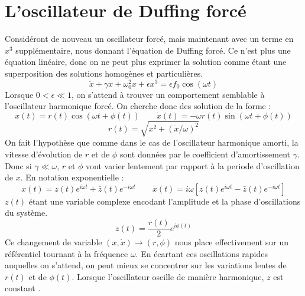 \chapter{L'oscillateur de Duffing forcé}
%
Considéront de nouveau un oscillateur forcé, mais maintenant avec un terme en $x^3$ supplémentaire, nous donnant l'équation de Duffing forcé. Ce n'est plus une équation linéaire, donc on ne peut plus exprimer la solution comme étant une superposition des solutions homogènes et particulières.
%
%
\begin{equation}
    \ddot{x} + \gamma \dot{x} + \omega_0^2 x + \epsilon x^3 = \epsilon f_0 \cos(\omega t)
    \label{eq:duffing}
\end{equation}
%
Lorsque $0 < \epsilon \ll 1$, on s'attend à trouver un comportement semblable à l'oscillateur harmonique forcé. 
On cherche donc des solution de la forme :
\begin{equation}
x(t) = r(t)\cos(\omega t + \phi(t)) \qquad \dot{x}(t) =  -\omega r(t)\sin(\omega t + \phi(t))
\label{eq:duff_x_xdot}
\end{equation}
\begin{equation*}
    r(t) = \sqrt{x^2 + (\dot{x}/\omega)^2}
\end{equation*}
%
On fait l'hypothèse que comme dans le cas de l'oscillateur harmonique amorti, 
la vitesse d'évolution de $r$ et de $\phi$ sont données par le coefficient d'amortissement $\gamma$. 
Donc si $\gamma \ll \omega$,  $r$ et $\phi$ vont varier
 lentement par rapport à la periode d'oscillation de $x$.
%
En notation exponentielle :
\begin{equation}
    x(t) = z(t)e^{i\omega t} + \bar{z}(t) e^{-i\omega t}
    \qquad 
    \dot{x}(t) = i\omega \left[ z(t)e^{i\omega t} - \bar{z}(t) e^{-i\omega t} \right]
\end{equation}
%
$z(t)$ étant une variable complexe encodant l'amplitude et la phase d'oscillations du système.
\[ z(t) = \frac{r(t)}{2}e^{i\phi(t)} \]
%
Ce changement de variable $(x, \dot{x}) \to (r, \phi)$ nous place effectivement sur un référentiel tournant à la fréquence $\omega$. 
En écartant ces oscillations rapides auquelles on s'attend, on peut mieux se concentrer sur les variations lentes de $r(t)$ et de $\phi(t)$. 
Lorsque l'oscillateur oscille de manière harmonique, $z$ est constant \cite{pistolesi_duffing_nodate}.

